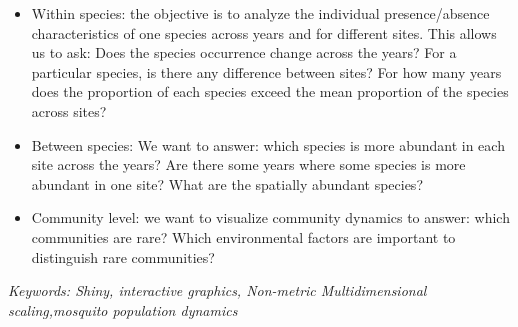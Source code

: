 \documentclass{article}\usepackage[]{graphicx}\usepackage[]{color}
\begin{document}
\begin{itemize}
\item  Within species: the objective is to analyze the individual presence/absence characteristics of one species across years and for different sites.  This allows us to ask:  Does the species occurrence change across the years? For a particular species, is there any difference between sites?  For how many years does the proportion of each species exceed the mean proportion of the species across sites?

\item Between species:   We want to answer: which species is more abundant in each site across the years? Are there some years where some species is more abundant in one site? What are the spatially abundant species?

\item Community level: we want to visualize community dynamics to answer: which communities are rare? Which environmental factors are important to distinguish rare communities?
\end{itemize}

\emph{Keywords: Shiny, interactive graphics, Non-metric Multidimensional scaling,mosquito population dynamics} 
\end{document}
